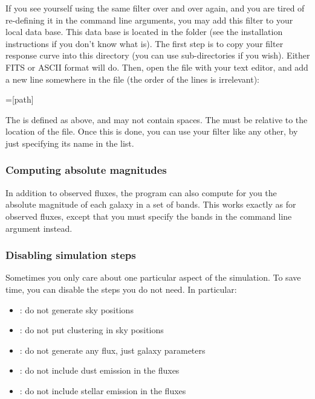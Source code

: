 If you see yourself using the same filter over and over again, and you are tired of re-defining it in the command line arguments, you may add this filter to your local \egg data base. This data base is located in the
 folder (see the installation instructions if you don't know what  is).
The first step is to copy your filter response curve into this directory (you can use sub-directories if you wish). Either FITS or ASCII format will do. Then, open the  file with your text editor, and add a new line somewhere in the file (the order of the lines is irrelevant):
\begin{bashcode}
=[path]
\end{bashcode}
The  is defined as above, and may not contain spaces. The \bashinline{[path]} must be relative to the location of the  file. Once this is done, you can use your filter like any other, by just specifying its name in the  list.


\subsubsection{Computing absolute magnitudes}

In addition to observed fluxes, the program can also compute for you the absolute magnitude of each galaxy in a set of bands. This works exactly as for observed fluxes, except that you must specify the bands in the  command line argument instead.


\subsubsection{Disabling simulation steps}

Sometimes you only care about one particular aspect of the simulation. To save time, you can disable the steps you do not need. In particular:
\begin{itemize}
\item {}: do not generate sky positions
\item {}: do not put clustering in sky positions
\item {}: do not generate any flux, just galaxy parameters
\item {}: do not include dust emission in the fluxes
\item {}: do not include stellar emission in the fluxes
\end{itemize}


